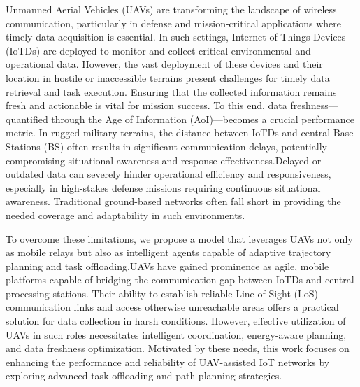 \documentclass[conference]{IEEEtran}
\begin{document}

Unmanned Aerial Vehicles (UAVs) are transforming the landscape of wireless communication, particularly in defense and mission-critical applications where timely data acquisition is essential. In such settings, Internet of Things Devices (IoTDs) are deployed to monitor and collect critical environmental and operational data. However, the vast deployment of these devices and their location in hostile or inaccessible terrains present challenges for timely data retrieval and task execution. Ensuring that the collected information remains fresh and actionable is vital for mission success. To this end, data freshness—quantified through the Age of Information (AoI)—becomes a crucial performance metric. In rugged military terrains, the distance between IoTDs and central Base Stations (BS) often results in significant communication delays, potentially compromising situational awareness and response effectiveness.Delayed or outdated data can severely hinder operational efficiency and responsiveness, especially in high-stakes defense missions requiring continuous situational awareness. Traditional ground-based networks often fall short in providing the needed coverage and adaptability in such environments.

To overcome these limitations, we propose a model that leverages UAVs not only as mobile relays but also as intelligent agents capable of adaptive trajectory planning and task offloading.UAVs have gained prominence as agile, mobile platforms capable of bridging the communication gap between IoTDs and central processing stations. Their ability to establish reliable Line-of-Sight (LoS) communication links and access otherwise unreachable areas offers a practical solution for data collection in harsh conditions. However, effective utilization of UAVs in such roles necessitates intelligent coordination, energy-aware planning, and data freshness optimization. Motivated by these needs, this work focuses on enhancing the performance and reliability of UAV-assisted IoT networks by exploring advanced task offloading and path planning strategies.
\end{document}
